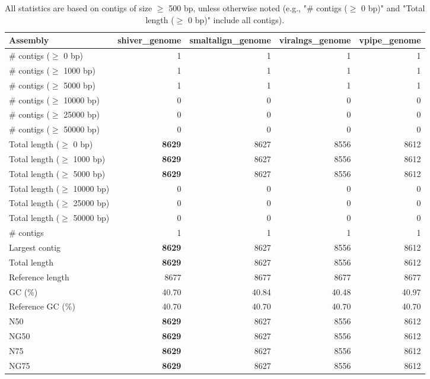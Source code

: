 \documentclass[12pt,a4paper]{article}
\begin{document}
\begin{table}[ht]
\begin{center}
\caption{All statistics are based on contigs of size $\geq$ 500 bp, unless otherwise noted (e.g., "\# contigs ($\geq$ 0 bp)" and "Total length ($\geq$ 0 bp)" include all contigs).}
\begin{tabular}{|l*{4}{|r}|}
\hline
Assembly & shiver\_genome & smaltalign\_genome & viralngs\_genome & vpipe\_genome \\ \hline
\# contigs ($\geq$ 0 bp) & 1 & 1 & 1 & 1 \\ \hline
\# contigs ($\geq$ 1000 bp) & 1 & 1 & 1 & 1 \\ \hline
\# contigs ($\geq$ 5000 bp) & 1 & 1 & 1 & 1 \\ \hline
\# contigs ($\geq$ 10000 bp) & 0 & 0 & 0 & 0 \\ \hline
\# contigs ($\geq$ 25000 bp) & 0 & 0 & 0 & 0 \\ \hline
\# contigs ($\geq$ 50000 bp) & 0 & 0 & 0 & 0 \\ \hline
Total length ($\geq$ 0 bp) & {\bf 8629} & 8627 & 8556 & 8612 \\ \hline
Total length ($\geq$ 1000 bp) & {\bf 8629} & 8627 & 8556 & 8612 \\ \hline
Total length ($\geq$ 5000 bp) & {\bf 8629} & 8627 & 8556 & 8612 \\ \hline
Total length ($\geq$ 10000 bp) & 0 & 0 & 0 & 0 \\ \hline
Total length ($\geq$ 25000 bp) & 0 & 0 & 0 & 0 \\ \hline
Total length ($\geq$ 50000 bp) & 0 & 0 & 0 & 0 \\ \hline
\# contigs & 1 & 1 & 1 & 1 \\ \hline
Largest contig & {\bf 8629} & 8627 & 8556 & 8612 \\ \hline
Total length & {\bf 8629} & 8627 & 8556 & 8612 \\ \hline
Reference length & 8677 & 8677 & 8677 & 8677 \\ \hline
GC (\%) & 40.70 & 40.84 & 40.48 & 40.97 \\ \hline
Reference GC (\%) & 40.70 & 40.70 & 40.70 & 40.70 \\ \hline
N50 & {\bf 8629} & 8627 & 8556 & 8612 \\ \hline
NG50 & {\bf 8629} & 8627 & 8556 & 8612 \\ \hline
N75 & {\bf 8629} & 8627 & 8556 & 8612 \\ \hline
NG75 & {\bf 8629} & 8627 & 8556 & 8612 \\ \hline

\end{tabular}
\end{center}
\end{table}
\end{document}
